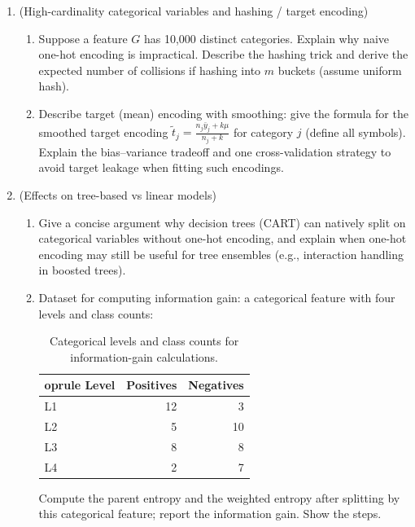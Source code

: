 \documentclass[12pt,a4paper]{article}
\begin{document}
\begin{enumerate}[label=(\arabic*)]
\item (High-cardinality categorical variables and hashing / target encoding)
    \begin{enumerate}[label=(\alph*)]
    \item Suppose a feature \(G\) has 10,000 distinct categories. Explain why naive one-hot encoding is impractical. Describe the hashing trick and derive the expected number of collisions if hashing into \(m\) buckets (assume uniform hash).
    \item Describe target (mean) encoding with smoothing: give the formula for the smoothed target encoding \(\tilde{t}_j = \frac{n_j\bar{y}_j + k\mu}{n_j + k}\) for category \(j\) (define all symbols). Explain the bias–variance tradeoff and one cross-validation strategy to avoid target leakage when fitting such encodings.
    \end{enumerate}

\item (Effects on tree-based vs linear models)
    \begin{enumerate}[label=(\alph*)]
    \item Give a concise argument why decision trees (CART) can natively split on categorical variables without one-hot encoding, and explain when one-hot encoding may still be useful for tree ensembles (e.g., interaction handling in boosted trees).
    \item Dataset for computing information gain: a categorical feature with four levels and class counts:
    \begin{table}[H]
    \centering
    \begin{tabular}{lrr}
    	oprule
    Level & Positives & Negatives \\
    \midrule
    L1 & 12 & 3 \\
    L2 & 5 & 10 \\
    L3 & 8 & 8 \\
    L4 & 2 & 7 \\
    \bottomrule
    \end{tabular}
    \caption{Categorical levels and class counts for information-gain calculations.}
    \end{table}
    Compute the parent entropy and the weighted entropy after splitting by this categorical feature; report the information gain. Show the steps.
    \end{enumerate}


\end{enumerate}
\end{document}
